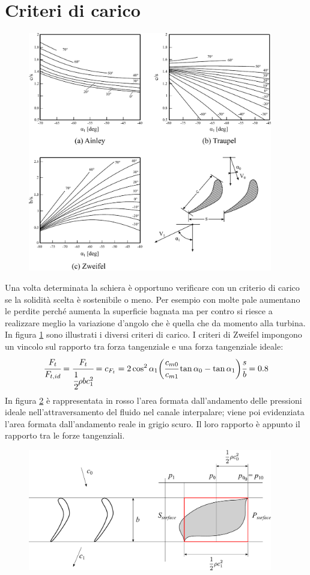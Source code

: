 \section{Criteri di carico}
\begin{figure}[h!]
\centering
  \includegraphics[width=0.95\textwidth]{fig/Ainley.pdf}
\caption{}
\label{fig:Ainley}
\end{figure}
Una volta determinata la schiera è opportuno verificare con un criterio di carico se la solidità scelta è sostenibile o meno. Per esempio con molte pale aumentano le perdite perché aumenta la superficie bagnata ma per contro si riesce a realizzare meglio la variazione d'angolo che è quella che da momento alla turbina.\\
In figura \ref{fig:Ainley} sono illustrati i diversi criteri di carico. I criteri di Zweifel impongono un vincolo sul rapporto tra forza tangenziale e una forza tangenziale ideale:
\begin{align*}
\cfrac{F_t}{F_{t,id}} = \cfrac{F_t}{\cfrac{1}{2} \rho b c_1^2} = c_{F_t} = 2 \cos^2 \alpha_1 \bigg(\cfrac{c_{m0}}{c_{m1}} \tan \alpha_0 - \tan \alpha_1 \bigg) \cfrac{s}{b} = 0.8
\end{align*}
In figura \ref{fig:CritCaricoT} è rappresentata in rosso l'area formata dall'andamento delle pressioni ideale nell'attraversamento del fluido nel canale interpalare; viene poi evidenziata l'area formata dall'andamento reale in grigio scuro. Il loro rapporto è appunto il rapporto tra le forze tangenziali.
\begin{figure}[h!]
\centering
  \includegraphics[width=0.95\textwidth]{fig/CritCaricoT.pdf}
\caption{}
\label{fig:CritCaricoT}
\end{figure}